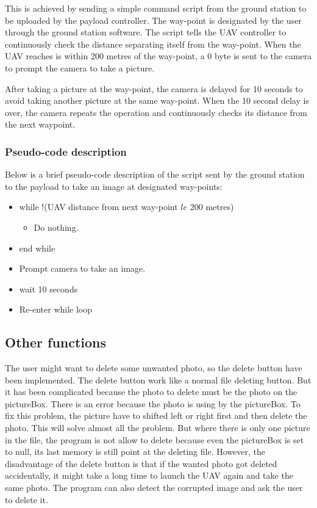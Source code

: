 This is achieved by sending a simple command script from
the ground station to be uploaded by the payload 
controller. The way-point is designated by the user
through the ground station software. The script 
tells the UAV controller to continuously check the
distance separating itself from the way-point.
When the UAV reaches is within 200 metres of the
way-point, a 0 byte is sent to the camera to prompt
the camera to take a picture.

After taking a picture at the way-point, the camera
is delayed for 10 seconds to avoid taking another picture
at the same way-point. When the 10 second delay is over,
the camera repeats the operation and continuously checks
its distance from the next waypoint.

\subsubsection{Pseudo-code description}

Below is a brief pseudo-code description of the script
sent by the ground station to the payload to take an
image at designated way-points:

\begin{itemize}
	\item while !(UAV distance from next way-point $le$ 200 metres)
		\begin{itemize}
			\item Do nothing.
		\end{itemize}
	\item end while
	\item Prompt camera to take an image.
	\item wait 10 seconds
	\item Re-enter while loop
\end{itemize}

\subsection{Other functions}
The user might want to delete some unwanted photo, so the delete button have been implemented. The delete button work like a normal file deleting button. But it has been complicated because the photo to delete must be the photo on the pictureBox. There is an error because the photo is using by the pictureBox. To fix this problem, the picture have to shifted left or right first and then delete the photo. This will solve almost all the problem. But where there is only one picture in the file, the program is not allow to delete because even the pictureBox is set to null, its last memory is still point at the deleting file. However, the disadvantage of the delete button is that if the wanted photo got deleted accidentally, it might take a long time to launch the UAV again and take the same photo. The program can also detect the corrupted image and ask the user to delete it.

